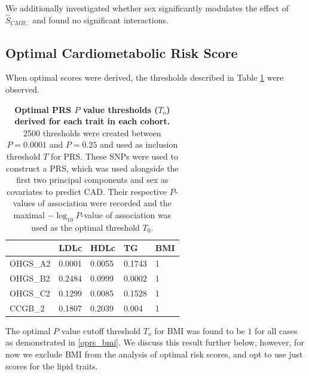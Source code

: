 We additionally investigated whether sex significantly modulates the effect of  $\hat{S}_{CMB; .}$ and found no significant interactions. 

\subsection{Optimal Cardiometabolic Risk Score}

When optimal scores were derived, the thresholds described in Table \ref{oprs} were observed.

\begin{table}[H]
\centering

\begin{tabular}{lllll}
\hline
                  & \textbf{LDLc} & \textbf{HDLc} & \textbf{TG} & \textbf{BMI} \\ \hline
OHGS\_A2 & 0.0001        & 0.0055        & 0.1743      & 1            \\
OHGS\_B2 & 0.2484        & 0.0999        & 0.0002      & 1            \\
OHGS\_C2 & 0.1299        & 0.0085        & 0.1528      & 1            \\
CCGB\_2  & 0.1807        & 0.2039        & 0.004       & 1            \\ \hline
\end{tabular}

\caption[Optimal \ac{PRS} $P$-value thresholds.]{\textbf{Optimal \ac{PRS} $P$ value thresholds ($T_o$) derived for each trait in each cohort.} 2500 thresholds were created between $P = 0.0001$ and $P = 0.25$ and used as inclusion threshold $T$ for \ac{PRS}. These \acp{SNP} were used to construct a \ac{PRS}, which was used alongside the first two principal components and sex as covariates to predict \ac{CAD}. Their respective $P$-values of association were recorded and the maximal $-\log_{10} P$-value of association was used as the optimal threshold $T_0$.}
\label{oprs}
\end{table}


The optimal $P$ value cutoff threshold $T_o$ for \ac{BMI} was found to be $1$ for all cases as demonstrated in \ref{oprs_bmi}. We discuss this result further below, however, for now we exclude \ac{BMI} from the analysis of optimal risk scores, and opt to use just scores for the lipid traits.

